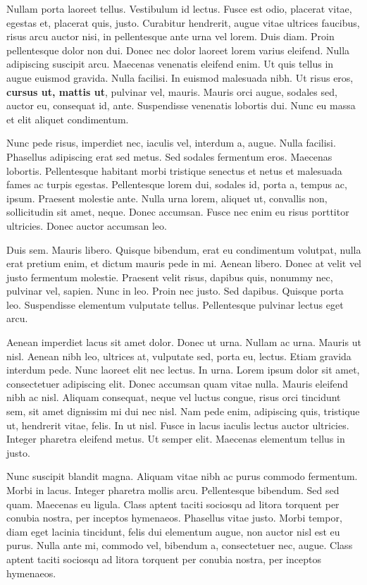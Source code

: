 \documentclass{book}
\begin{document}
Nullam porta laoreet tellus. Vestibulum id lectus. Fusce est odio, placerat vitae, egestas et, placerat quis, justo. Curabitur hendrerit, augue vitae ultrices faucibus, risus arcu auctor nisi, in pellentesque ante urna vel lorem. Duis diam. Proin pellentesque dolor non dui. Donec nec dolor laoreet lorem varius eleifend. Nulla adipiscing suscipit arcu. Maecenas venenatis eleifend enim. Ut quis tellus in augue euismod gravida. Nulla facilisi. In euismod malesuada nibh. Ut risus eros, \textbf{cursus ut, mattis ut}, pulvinar vel, mauris. Mauris orci augue, sodales sed, auctor eu, consequat id, ante. Suspendisse venenatis lobortis dui. Nunc eu massa et elit aliquet condimentum.

Nunc pede risus, imperdiet nec, iaculis vel, interdum a, augue. Nulla facilisi. Phasellus adipiscing erat sed metus. Sed sodales fermentum eros. Maecenas lobortis. Pellentesque habitant morbi tristique senectus et netus et malesuada fames ac turpis egestas. Pellentesque lorem dui, sodales id, porta a, tempus ac, ipsum. Praesent molestie ante. Nulla urna lorem, aliquet ut, convallis non, sollicitudin sit amet, neque. Donec accumsan. Fusce nec enim eu risus porttitor ultricies. Donec auctor accumsan leo.

Duis sem. Mauris libero. Quisque bibendum, erat eu condimentum volutpat, nulla erat pretium enim, et dictum mauris pede in mi. Aenean libero. Donec at velit vel justo fermentum molestie. Praesent velit risus, dapibus quis, nonummy nec, pulvinar vel, sapien. Nunc in leo. Proin nec justo. Sed dapibus. Quisque porta leo. Suspendisse elementum vulputate tellus. Pellentesque pulvinar lectus eget arcu.

Aenean imperdiet lacus sit amet dolor. Donec ut urna. Nullam ac urna. Mauris ut nisl. Aenean nibh leo, ultrices at, vulputate sed, porta eu, lectus. Etiam gravida interdum pede. Nunc laoreet elit nec lectus. In urna. Lorem ipsum dolor sit amet, consectetuer adipiscing elit. Donec accumsan quam vitae nulla. Mauris eleifend nibh ac nisl. Aliquam consequat, neque vel luctus congue, risus orci tincidunt sem, sit amet dignissim mi dui nec nisl. Nam pede enim, adipiscing quis, tristique ut, hendrerit vitae, felis. In ut nisl. Fusce in lacus iaculis lectus auctor ultricies. Integer pharetra eleifend metus. Ut semper elit. Maecenas elementum tellus in justo.

Nunc suscipit blandit magna. Aliquam vitae nibh ac purus commodo fermentum. Morbi in lacus. Integer pharetra mollis arcu. Pellentesque bibendum. Sed sed quam. Maecenas eu ligula. Class aptent taciti sociosqu ad litora torquent per conubia nostra, per inceptos hymenaeos. Phasellus vitae justo. Morbi tempor, diam eget lacinia tincidunt, felis dui elementum augue, non auctor nisl est eu purus. Nulla ante mi, commodo vel, bibendum a, consectetuer nec, augue. Class aptent taciti sociosqu ad litora torquent per conubia nostra, per inceptos hymenaeos.
\end{document}
